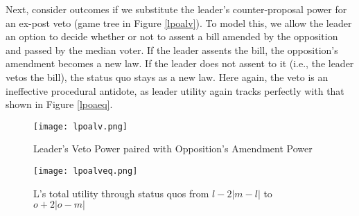 \documentclass[12pt]{article}
\theoremstyle{plain}		      \newtheorem{assn}{Assumption}
\theoremstyle{plain}		      \newtheorem{prop}{Proposition}
\theoremstyle{plain}		      \newtheorem{lemma}{Lemma}
\theoremstyle{plain}	          \newtheorem{imp}{Implication}
\theoremstyle{plain}	          \newtheorem{hyp}{Hypothesis}
\theoremstyle{definition}		  \newtheorem{defn}{Definition}
\theoremstyle{remark}	          \newtheorem{rem}{Remark}
\theoremstyle{definition}         \newtheorem{case}{Case}
\begin{document}

\indent Next, consider outcomes if we substitute the leader's counter-proposal power for an ex-post veto (game tree in Figure \ref{lpoalv}). To model this, we allow the leader an option to decide whether or not to assent a bill amended by the opposition and passed by the median voter. If the leader assents the bill, the opposition's amendment becomes a new law. If the leader does not assent to it (i.e., the leader vetos the bill), the status quo stays as a new law. Here again, the veto is an ineffective procedural antidote, as leader utility again tracks perfectly with that shown in Figure \ref{lpoaeq}. 
\begin{figure}[h]
  \centering
  \begin{minipage}[b]{0.3\textwidth}
    \texttt{[image: lpoalv.png]}
    \caption{Leader's Veto Power paired with Opposition's Amendment Power}
    \label{lpoalv}
  \end{minipage}
  \hfill
  \begin{minipage}[b]{0.6\textwidth}
    \texttt{[image: lpoalveq.png]}
    \caption{L's total utility through status quos \newline from $l-2|m-l|$ to $o+2|o-m|$}
    \label{lpoalveq}
  \end{minipage}
\end{figure}
\FloatBarrier
\end{document}
